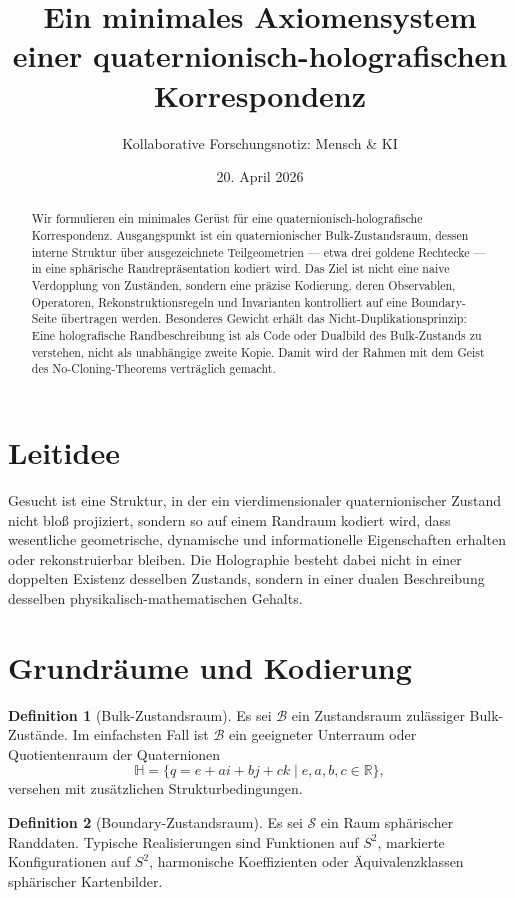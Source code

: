 \documentclass[11pt,a4paper]{article}
\title{Ein minimales Axiomensystem einer quaternionisch-holografischen Korrespondenz}
\author{Kollaborative Forschungsnotiz: Mensch \& KI}
\date{20. April 2026}
\theoremstyle{definition}
\newtheorem{definition}{Definition}
\theoremstyle{remark}
\begin{document}
\maketitle

\begin{abstract}
Wir formulieren ein minimales Gerüst für eine quaternionisch-holografische Korrespondenz. Ausgangspunkt ist ein quaternionischer Bulk-Zustandsraum, dessen interne Struktur über ausgezeichnete Teilgeometrien --- etwa drei goldene Rechtecke --- in eine sphärische Randrepräsentation kodiert wird. Das Ziel ist nicht eine naive Verdopplung von Zuständen, sondern eine präzise Kodierung, deren Observablen, Operatoren, Rekonstruktionsregeln und Invarianten kontrolliert auf eine Boundary-Seite übertragen werden. Besonderes Gewicht erhält das Nicht-Duplikationsprinzip: Eine holografische Randbeschreibung ist als Code oder Dualbild des Bulk-Zustands zu verstehen, nicht als unabhängige zweite Kopie. Damit wird der Rahmen mit dem Geist des No-Cloning-Theorems verträglich gemacht.
\end{abstract}

\section{Leitidee}
Gesucht ist eine Struktur, in der ein vierdimensionaler quaternionischer Zustand nicht bloß projiziert, sondern so auf einem Randraum kodiert wird, dass wesentliche geometrische, dynamische und informationelle Eigenschaften erhalten oder rekonstruierbar bleiben. Die Holographie besteht dabei nicht in einer doppelten Existenz desselben Zustands, sondern in einer dualen Beschreibung desselben physikalisch-mathematischen Gehalts.

\section{Grundräume und Kodierung}

\begin{definition}[Bulk-Zustandsraum]
Es sei $\mathcal{B}$ ein Zustandsraum zulässiger Bulk-Zustände. Im einfachsten Fall ist $\mathcal{B}$ ein geeigneter Unterraum oder Quotientenraum der Quaternionen
\[
\mathbb{H}=\{q=e+ai+bj+ck\mid e,a,b,c\in\mathbb{R}\},
\]
versehen mit zusätzlichen Strukturbedingungen.
\end{definition}

\begin{definition}[Boundary-Zustandsraum]
Es sei $\mathcal{S}$ ein Raum sphärischer Randdaten. Typische Realisierungen sind Funktionen auf $S^2$, markierte Konfigurationen auf $S^2$, harmonische Koeffizienten oder Äquivalenzklassen sphärischer Kartenbilder.
\end{definition}
\end{document}
